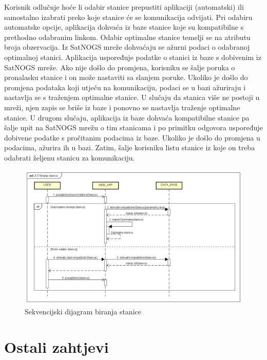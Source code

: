 			{Korisnik odlučuje hoće li odabir stanice prepustiti aplikaciji (automatski) ili samostalno izabrati preko koje stanice će se komunikacija odvijati. Pri odabiru automatske opcije, aplikacija dohvaća iz baze stanice koje su kompatibilne s prethodno odabranim linkom. Odabir optimalne stanice temelji se na atributu broja obzervacija. Iz SatNOGS mreže dohvaćaju se ažurni podaci o odabranoj optimalnoj stanici. Aplikacija uspoređuje podatke o stanici iz baze s dobivenim iz SatNOGS mreže. Ako nije došlo do promjena, korisniku se šalje poruka o pronalasku stanice i on može nastaviti sa slanjem poruke. Ukoliko je došlo do promjena podataka koji utječu na komunikaciju, podaci se u bazi ažuriraju i nastavlja se s traženjem optimalne stanice. U slučaju da stanica više ne postoji u mreži, njen zapis se briše iz baze i ponovno se nastavlja traženje optimalne stanice. \newline
				U drugom slučaju, aplikacija iz baze dohvaća kompatibilne stanice pa šalje upit na SatNOGS mrežu o tim stanicama i po primitku odgovora uspoređuje dobivene podatke s pročitanim podacima iz baze. Ukoliko je došlo do promjena u podacima, ažurira ih u bazi. Zatim, šalje korisniku listu stanice iz koje on treba odabrati željenu stanicu za komunikaciju.}
			
			
				\begin{figure}[H]
					\includegraphics[width=\linewidth]{Sekvencijski3.png}
					\caption{Sekvencijski dijagram biranja stanice}
					\label{fig:Sekvencijski }
				\end{figure}
				
	
		\section{Ostali zahtjevi}
		 
